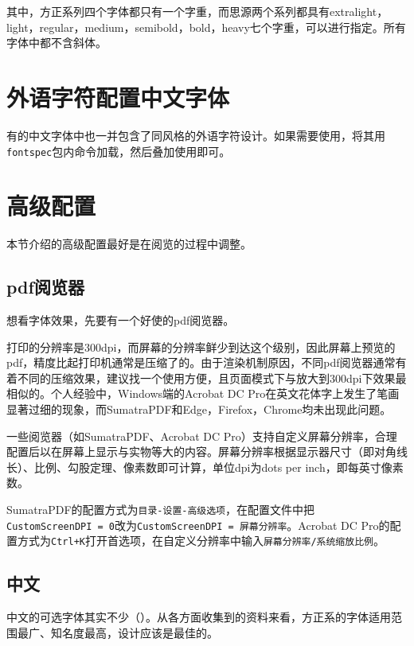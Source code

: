 \documentclass[10pt,openany]{book}
\begin{document}


其中，方正系列四个字体都只有一个字重，而思源两个系列都具有extralight，light，regular，medium，semibold，bold，heavy七个字重，可以进行指定。所有字体中都不含斜体。

\section{外语字符配置中文字体}

有的中文字体中也一并包含了同风格的外语字符设计。如果需要使用，将其用\texttt{fontspec}包内命令加载，然后叠加使用即可。



\section{高级配置}

本节介绍的高级配置最好是在阅览的过程中调整。

\subsection{pdf阅览器}

想看字体效果，先要有一个好使的pdf阅览器。

打印的分辨率是300dpi，而屏幕的分辨率鲜少到达这个级别，因此屏幕上预览的pdf，精度比起打印机通常是压缩了的。由于渲染机制原因，不同pdf阅览器通常有着不同的压缩效果，建议找一个使用方便，且页面模式下与放大到300dpi下效果最相似的。个人经验中，Windows端的Acrobat DC Pro在英文花体字上发生了笔画显著过细的现象，而SumatraPDF和Edge，Firefox，Chrome均未出现此问题。

一些阅览器（如SumatraPDF、Acrobat DC Pro）支持自定义屏幕分辨率，合理配置后以在屏幕上显示与实物等大的内容。屏幕分辨率根据显示器尺寸（即对角线长）、比例、勾股定理、像素数即可计算，单位dpi为dots per inch，即每英寸像素数。

SumatraPDF的配置方式为\texttt{目录-设置-高级选项}，在配置文件中把\texttt{CustomScreenDPI\ =\ 0}改为\texttt{CustomScreenDPI\ =\ 屏幕分辨率}。Acrobat DC Pro的配置方式为\texttt{Ctrl+K}打开首选项，在自定义分辨率中输入\texttt{屏幕分辨率/系统缩放比例}。

\subsection{中文}

中文的可选字体其实不少（）。从各方面收集到的资料来看，方正系的字体适用范围最广、知名度最高，设计应该是最佳的。
\end{document}

